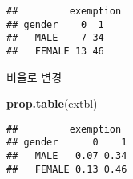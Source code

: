 \documentclass[
]{article}
\newenvironment{Shaded}{\begin{snugshade}}{\end{snugshade}}
\newcommand{\KeywordTok}[1]{\textcolor[rgb]{0.13,0.29,0.53}{\textbf{#1}}}
\newcommand{\NormalTok}[1]{#1}
\begin{document}
\begin{verbatim}
##         exemption
## gender    0  1
##   MALE    7 34
##   FEMALE 13 46
\end{verbatim}

비율로 변경

\begin{Shaded}
\begin{Highlighting}[]
\KeywordTok{prop.table}\NormalTok{(extbl)}
\end{Highlighting}
\end{Shaded}

\begin{verbatim}
##         exemption
## gender      0    1
##   MALE   0.07 0.34
##   FEMALE 0.13 0.46
\end{verbatim}
\end{document}
